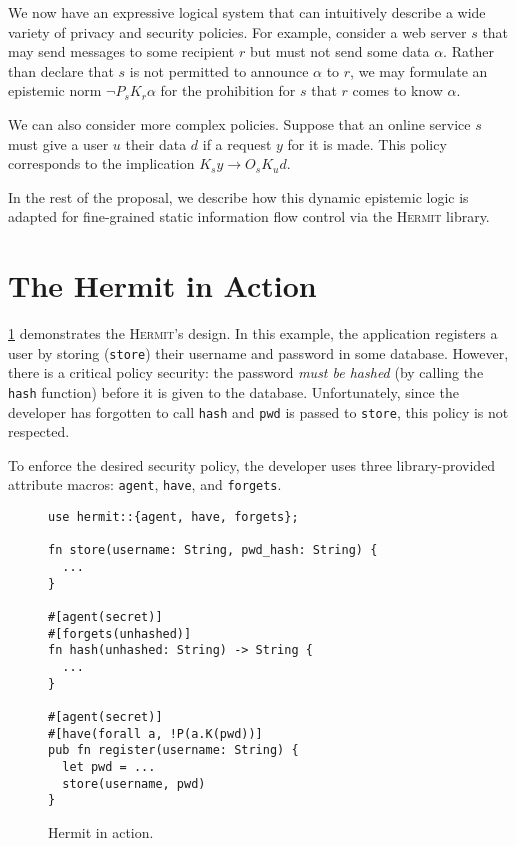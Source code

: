 \documentclass[letterpaper,twocolumn,10pt]{article}
\newcommand{\Hermit}{\textsc{Hermit}}
\begin{document}
We now have an expressive logical system that can intuitively describe a wide variety of privacy and
security policies. For example, consider a web server \(s\) that may send messages to some
recipient \(r\) but must not send some data \(\alpha\). Rather than declare that \(s\) is not
permitted to announce \(\alpha\) to \(r\), we may formulate an epistemic norm \(\lnot P_s K_r
\alpha\) for the prohibition for \(s\) that \(r\) comes to know \(\alpha\).

We can also consider more complex policies. Suppose that an online service \(s\) must give a user
\(u\) their data \(d\) if a request \(y\) for it is made. This policy corresponds to the implication
\(K_s y \to O_s K_u d\).

In the rest of the proposal, we describe how this dynamic epistemic logic is adapted for
fine-grained static information flow control via the \Hermit{} library.

\section{The Hermit in Action}

\cref{fig:example} demonstrates the \Hermit's design. In this example, the application registers a
user by storing (\lstinline{store}) their username and password in some database. However, there is
a critical policy security: the password \emph{must be hashed} (by calling the \lstinline{hash}
function) before it is given to the database. Unfortunately, since the developer has forgotten to
call \lstinline{hash} and \lstinline{pwd} is passed to \lstinline{store}, this policy is not
respected.

To enforce the desired security policy, the developer uses three library-provided attribute macros:
\lstinline{agent}, \lstinline{have}, and \lstinline{forgets}.

\begin{figure}
  \centering
  \begin{lstlisting}
use hermit::{agent, have, forgets};

fn store(username: String, pwd_hash: String) {
  ...
}

#[agent(secret)]
#[forgets(unhashed)]
fn hash(unhashed: String) -> String {
  ...
}

#[agent(secret)]
#[have(forall a, !P(a.K(pwd))]
pub fn register(username: String) {
  let pwd = ...
  store(username, pwd)
}
  \end{lstlisting}
  \caption{Hermit in action.}
  \label{fig:example}
\end{figure}
\end{document}
